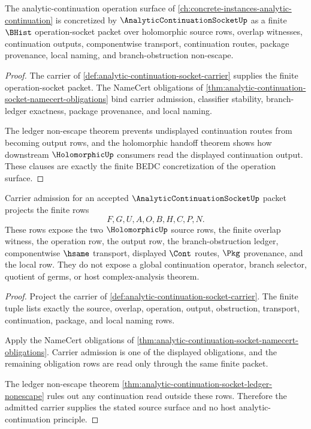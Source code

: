 \begin{theorem}
\label{thm:analytic-continuation-socket-vision-concretization}
The analytic-continuation operation surface of \autoref{ch:concrete-instances-analytic-continuation} is concretized by $\AnalyticContinuationSocketUp$ as a finite $\BHist$ operation-socket packet over holomorphic source rows, overlap witnesses, continuation outputs, componentwise transport, continuation routes, package provenance, local naming, and branch-obstruction non-escape.
\end{theorem}
\begin{proof}
The carrier of \autoref{def:analytic-continuation-socket-carrier} supplies the finite operation-socket packet. The NameCert obligations of \autoref{thm:analytic-continuation-socket-namecert-obligations} bind carrier admission, classifier stability, branch-ledger exactness, package provenance, and local naming.

The ledger non-escape theorem prevents undisplayed continuation routes from becoming output rows, and the holomorphic handoff theorem shows how downstream $\HolomorphicUp$ consumers read the displayed continuation output. These clauses are exactly the finite BEDC concretization of the operation surface.
\end{proof}

\begin{theorem}
\label{thm:analytic-continuation-socket-carrier-source-obligation}
Carrier admission for an accepted $\AnalyticContinuationSocketUp$ packet projects the finite rows
$$
F,G,U,A,O,B,H,C,P,N.
$$
These rows expose the two $\HolomorphicUp$ source rows, the finite overlap witness, the operation row, the output row, the branch-obstruction ledger, componentwise $\hsame$ transport, displayed $\Cont$ routes, $\Pkg$ provenance, and the local \NameCert{} row. They do not expose a global continuation operator, branch selector, quotient of germs, or host complex-analysis theorem.
\end{theorem}
\begin{proof}
Project the carrier of \autoref{def:analytic-continuation-socket-carrier}. The finite tuple lists exactly the source, overlap, operation, output, obstruction, transport, continuation, package, and local naming rows.

Apply the NameCert obligations of \autoref{thm:analytic-continuation-socket-namecert-obligations}. Carrier admission is one of the displayed obligations, and the remaining obligation rows are read only through the same finite packet.

The ledger non-escape theorem \autoref{thm:analytic-continuation-socket-ledger-nonescape} rules out any continuation read outside these rows. Therefore the admitted carrier supplies the stated source surface and no host analytic-continuation principle.
\end{proof}

